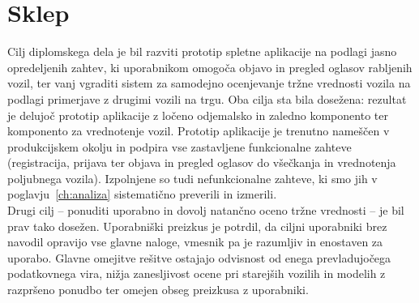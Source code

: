 \documentclass[a4paper,12pt,openright]{book}
\begin{document}
\chapter{Sklep}
\label{ch:sklep}
Cilj diplomskega dela je bil razviti prototip spletne aplikacije na podlagi jasno opredeljenih zahtev,
 ki uporabnikom omogoča objavo in
pregled oglasov rabljenih vozil, ter vanj vgraditi sistem za samodejno ocenjevanje
tržne vrednosti vozila na podlagi primerjave z drugimi vozili na trgu. Oba cilja sta bila dosežena:
rezultat je delujoč prototip aplikacije z ločeno odjemalsko in zaledno komponento ter komponento za
vrednotenje vozil.
Prototip aplikacije je trenutno nameščen v produkcijskem okolju in
podpira vse zastavljene funkcionalne zahteve (registracija, prijava ter objava in
pregled oglasov do všečkanja in vrednotenja poljubnega vozila). 
Izpolnjene so tudi nefunkcionalne zahteve, ki smo jih v poglavju~\ref{ch:analiza}
sistematično preverili in izmerili.\\
Drugi cilj -- ponuditi uporabno in dovolj natančno oceno tržne vrednosti -- je bil
prav tako dosežen. Uporabniški preizkus
je potrdil, da ciljni uporabniki brez navodil opravijo vse glavne naloge, vmesnik
pa je razumljiv in enostaven za uporabo. Glavne omejitve rešitve ostajajo odvisnost
od enega prevladujočega podatkovnega vira, nižja zanesljivost ocene pri starejših
vozilih in modelih z razpršeno ponudbo ter omejen obseg preizkusa z uporabniki.\\
\end{document}
